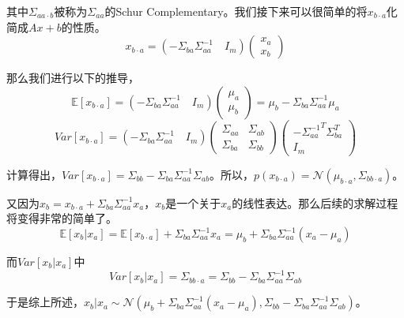 \documentclass[a4paper]{article}
\begin{document}
其中$\Sigma_{aa\cdot b}$被称为$\Sigma_{aa}$的Schur Complementary。我们接下来可以很简单的将$x_{b\cdot a}$化简成$Ax+b$的性质。
\begin{equation}
    x_{b\cdot a} = (-\Sigma_{ba}\Sigma_{aa}^{-1}\quad I_m)
    \begin{pmatrix}
        x_a \\
        x_b
    \end{pmatrix}
\end{equation}

那么我们进行以下的推导，
\begin{equation}
    \mathbb{E}[x_{b\cdot a}]= (-\Sigma_{ba}\Sigma_{aa}^{-1}\quad I_m)
    \begin{pmatrix}
        \mu_a \\
        \mu_b
    \end{pmatrix}
    =\mu_b-\Sigma_{ba}\Sigma_{aa}^{-1}\mu_a
\end{equation}
\begin{equation}
    Var[x_{b\cdot a}]=(-\Sigma_{ba}\Sigma_{aa}^{-1}\quad I_m)
    \begin{pmatrix}
    \Sigma_{aa} & \Sigma_{ab} \\
    \Sigma_{ba} & \Sigma_{bb} 
    \end{pmatrix}
    \begin{pmatrix}
        -{\Sigma_{aa}^{-1}}^T \Sigma_{ba}^T \\
        I_m
    \end{pmatrix}
\end{equation}

计算得出，$Var[x_{b\cdot a}]=\Sigma_{bb}-\Sigma_{ba}\Sigma_{aa}^{-1}\Sigma_{ab} $。所以，$p(x_{b\cdot a})=\mathcal{N}(\mu_{b\cdot a},\Sigma_{bb\cdot a})$。

又因为$x_b=x_{b\cdot a}+\Sigma_{ba}\Sigma_{aa}^{-1}x_a$，$x_b$是一个关于$x_a$的线性表达。那么后续的求解过程将变得非常的简单了。
\begin{equation}
    \mathbb{E}[x_b|x_a]=\mathbb{E}[x_{b\cdot a}] + \Sigma_{ba}\Sigma_{aa}^{-1}x_a = \mu_b+\Sigma_{ba}\Sigma_{aa}^{-1}(x_a-\mu_a)
\end{equation}

而$Var[x_b|x_a]$中
\begin{equation}
    Var[x_b|x_a] = \Sigma_{bb \cdot a} = \Sigma_{bb}-\Sigma_{ba}\Sigma_{aa}^{-1}\Sigma_{ab}
\end{equation}

于是综上所述，$x_b|x_a\sim \mathcal{N}(\mu_b+\Sigma_{ba}\Sigma_{aa}^{-1}(x_a-\mu_a), \Sigma_{bb}-\Sigma_{ba}\Sigma_{aa}^{-1}\Sigma_{ab})$。
\end{document}
